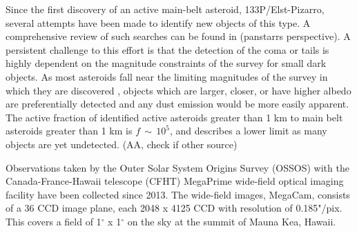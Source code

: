 \documentclass[iop,apj]{emulateapj}
\begin{document}
Since the first discovery of an active main-belt asteroid, 133P/Elst-Pizarro, several attempts have been made to identify new objects of this type. A comprehensive review of such searches can be found in \citet{hsieh2015}(panstarrs perspective).  A persistent challenge to this effort is that the detection of the coma or tails is highly dependent on the magnitude constraints of the survey for small dark objects. As most asteroids fall near the limiting magnitudes of the survey in which they are discovered \cite{jewitt15}, objects which are larger, closer, or have higher albedo are preferentially detected and any dust emission would be more easily apparent. The active fraction of identified active asteroids greater than 1 km to main belt asteroids greater than 1 km is $f \, \sim \, 10^5$, and describes a lower limit as many objects are yet undetected. \cite{jewitt15}(AA, check if other source) %



Observations taken by the Outer Solar System Origins Survey (OSSOS) with the Canada-France-Hawaii telescope (CFHT) MegaPrime wide-field optical imaging facility have been collected since 2013. The wide-field images, MegaCam, consists of a 36 CCD image plane, each 2048 x 4125 CCD with resolution of 0.185"/pix. This covers a field of  1$^{\circ}$ x 1$^{\circ}$ on the sky at the summit of Mauna Kea, Hawaii. %








\end{document}
